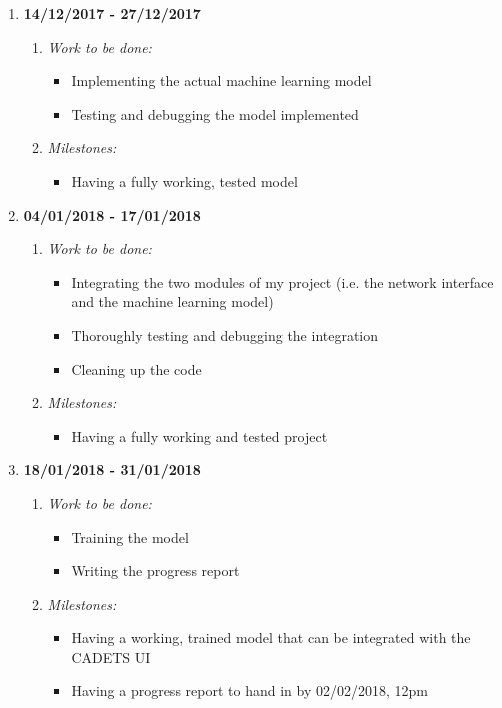 \begin{enumerate}
	\item \textbf{14/12/2017 - 27/12/2017}
		\begin{enumerate}
			\item \emph{Work to be done:}
			\begin{itemize}
				\item Implementing the actual machine learning model 
				\item Testing and debugging the model implemented
			\end{itemize}
			\item \emph{Milestones:}
			\begin{itemize}
				\item Having a fully working, tested model
			\end{itemize}
		\end{enumerate}
	
	\vspace{5mm}
	
	\item \textbf{04/01/2018 - 17/01/2018}
		\begin{enumerate}
			\item \emph{Work to be done:}
			\begin{itemize}
				\item Integrating the two modules of my project (i.e. the network interface and the machine learning model)
				\item Thoroughly testing and debugging the integration
				\item Cleaning up the code 
			\end{itemize}
			\item \emph{Milestones:}
			\begin{itemize}
				\item Having a fully working and tested project
			\end{itemize}
		\end{enumerate}

	\vspace{5mm}

	\item \textbf{18/01/2018 - 31/01/2018}
		\begin{enumerate}
			\item \emph{Work to be done:}
			\begin{itemize}
				\item Training the model
				\item Writing the progress report
			\end{itemize}
			\item \emph{Milestones:}
			\begin{itemize}
				\item Having a working, trained model that can be integrated with the CADETS UI
				\item Having a progress report to hand in by 02/02/2018, 12pm	
		\end{itemize}
		\end{enumerate}
	

\end{enumerate}
